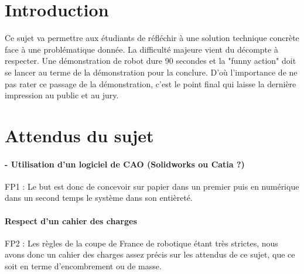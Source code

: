\documentclass[fleqn,10pt]{SelfArx} %
\begin{document}
\flushbottom %

\maketitle %

\tableofcontents %

\thispagestyle{empty} %


\section*{Introduction} %


Ce sujet va permettre aux étudiants de réfléchir à une solution technique concrète face à une problématique donnée. La difficulté majeure vient du décompte à respecter. Une démonstration de robot dure 90 secondes et la "funny action" doit se lancer au terme de la démonstration pour la conclure. D'où l'importance de ne pas rater ce passage de la démonstration, c'est le point final qui laisse la dernière impression au public et au jury.



\section{Attendus du sujet}

\paragraph{- Utilisation d’un logiciel de CAO (Solidworks ou Catia ?)}
FP1 : Le but est donc de concevoir sur papier dans un premier puis en numérique dans un second temps le système dans son entièreté.
\paragraph{Respect d’un cahier des charges}
FP2 : Les règles de la coupe de France de robotique étant très strictes, nous avons donc un cahier des charges assez précis sur les attendus de ce sujet, que ce soit en terme d'encombrement ou de masse. 
\end{document}
